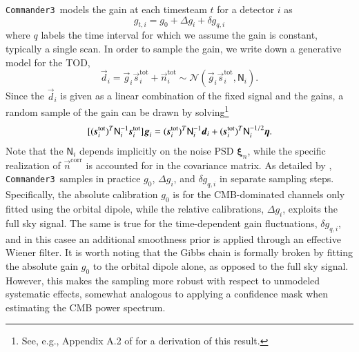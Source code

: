 \documentclass[twocolumn]{../../common/aa}
\def\commanderthree{\texttt{Commander3}}
\newcommand{\dv}[0]{\vec{d}}
\newcommand{\n}[0]{\vec{n}}
\newcommand{\s}[0]{\vec{s}}
\newcommand{\g}[0]{\vec{g}}
\newcommand{\N}[0]{\tens{N}}
\newcommand{\ncorr}{\vec n^\mathrm{corr}}
\begin{document}
\commanderthree\ models the gain at each timesteam $t$ for a detector $i$ as
\begin{equation}
	g_{t,i}=g_0+\Delta g_i+\delta g_{q,i}
\end{equation}
where $q$ labels the time interval for which we assume the gain is constant, typically a single scan. In order to sample the gain, we write down a generative model for the TOD,
\begin{equation}
	\dv_i=\g_{i}\s_{i}^\mathrm{tot} +\n_{i}^\mathrm{tot}\sim\mathcal N(\g_i\s_{i}^\mathrm{tot},\mathsf N_i).
\end{equation}
Since the $\dv_i$ is given as a linear combination of the fixed signal and the gains, a random sample of the gain can be drawn by solving\footnote{See, e.g., Appendix A.2 of \citet{bp01} for a derivation of this result.}
\begin{equation}
	\label{eq:gain_gauss_samp}
	[(\s_i^\mathrm{tot})^T\mathsf N_i^{-1}\s_i^\mathrm{tot}]\g_i
	=(\s_i^\mathrm{tot})^T\N^{-1}_i\dv_i
	+(\s_i^\mathrm{tot})^T\N^{-1/2}_i\boldsymbol\eta.
\end{equation}
Note that the $\mathsf N_i$ depends implicitly on the noise PSD $\boldsymbol \xi_n$, while the specific realization of $\ncorr$ is accounted for in the covariance matrix.
As detailed by \citet{bp07}, \commanderthree\ samples in practice $g_0$, $\Delta g_i$, and $\delta g_{q,i}$ in separate sampling steps. Specifically, the absolute calibration $g_0$ is for the CMB-dominated channels only fitted using the orbital dipole, while the relative calibrations, $\Delta g_i$, exploits the full sky signal. The same is true for the time-dependent gain fluctuations, $\delta g_{q,i}$, and in this casee an additional smoothness prior is applied through an effective Wiener filter. It is worth noting that the Gibbs chain is formally broken by fitting the absolute gain $g_0$ to the orbital dipole alone, as opposed to the full sky signal. However, this makes the sampling more robust with respect to unmodeled systematic effects, somewhat analogous to applying a confidence mask when estimating the CMB power spectrum.
\end{document}
